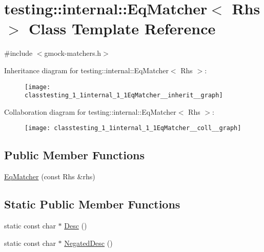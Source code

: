 \hypertarget{classtesting_1_1internal_1_1EqMatcher}{}\section{testing\+:\+:internal\+:\+:Eq\+Matcher$<$ Rhs $>$ Class Template Reference}
\label{classtesting_1_1internal_1_1EqMatcher}


{\ttfamily \#include $<$gmock-\/matchers.\+h$>$}



Inheritance diagram for testing\+:\+:internal\+:\+:Eq\+Matcher$<$ Rhs $>$\+:\nopagebreak
\begin{figure}[H]
\begin{center}
\leavevmode
\texttt{[image: classtesting\_1\_1internal\_1\_1EqMatcher\_\_inherit\_\_graph]}
\end{center}
\end{figure}


Collaboration diagram for testing\+:\+:internal\+:\+:Eq\+Matcher$<$ Rhs $>$\+:\nopagebreak
\begin{figure}[H]
\begin{center}
\leavevmode
\texttt{[image: classtesting\_1\_1internal\_1\_1EqMatcher\_\_coll\_\_graph]}
\end{center}
\end{figure}
\subsection*{Public Member Functions}
\begin{DoxyCompactItemize}
\item 
\hyperlink{classtesting_1_1internal_1_1EqMatcher_a9051e33bc31f413a3c958d04cc090b46}{Eq\+Matcher} (const Rhs \&rhs)
\end{DoxyCompactItemize}
\subsection*{Static Public Member Functions}
\begin{DoxyCompactItemize}
\item 
static const char $\ast$ \hyperlink{classtesting_1_1internal_1_1EqMatcher_a3ddc72ceade061ad56debfa0a4dc2749}{Desc} ()
\item 
static const char $\ast$ \hyperlink{classtesting_1_1internal_1_1EqMatcher_ae99a542c124694d5b91793a2df9202dc}{Negated\+Desc} ()
\end{DoxyCompactItemize}


